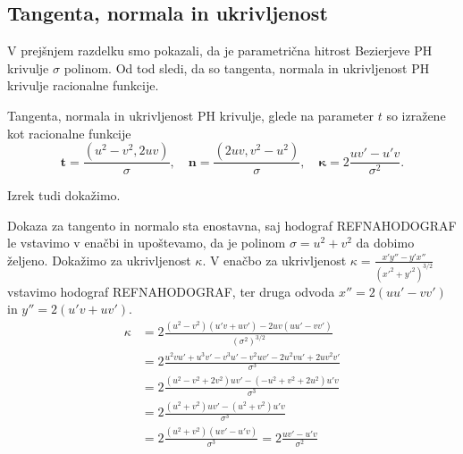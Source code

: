 \documentclass[isrm2, tisk]{fmfdelo}
\begin{document}
    \subsection{Tangenta, normala in ukrivljenost}
    V prejšnjem razdelku smo pokazali, da je parametrična hitrost Bezierjeve PH krivulje $\sigma$ polinom.
    Od tod sledi, da so tangenta, normala in ukrivljenost PH krivulje racionalne funkcije.
    \begin{izrek}
        Tangenta, normala in ukrivljenost PH krivulje, glede na parameter $t$ so izražene kot racionalne funkcije
        \[\mathbf{t}=\frac{(u^2-v^2,2uv)}{\sigma}, \quad \mathbf{n}=\frac{(2uv,v^2-u^2)}{\sigma},\quad \mathbf{\kappa}=2\frac{uv'-u'v}{\sigma^2}.\]
    \end{izrek}
    Izrek tudi dokažimo.
    \begin{dokaz}
        Dokaza za tangento in normalo sta enostavna, saj hodograf REFNAHODOGRAF le vstavimo v enačbi in upoštevamo, da je polinom $\sigma = u^2+v^2$ da dobimo željeno.
        Dokažimo za ukrivljenost $\kappa$.
        V enačbo za ukrivljenost  $\kappa = \frac{x'y''-y'x''}{(x'^2+y'^2)^{3/2}}$ vstavimo hodograf REFNAHODOGRAF, ter druga odvoda $x'' = 2(uu'-vv')$ in $y'' = 2(u'v+uv')$.
        \begin{align*}
            \kappa &= 2\frac{(u^2-v^2)(u'v+uv') - 2uv(uu'-vv')}{(\sigma^2)^{3/2}}\\
            &= 2\frac{u^2vu' + u^3v' - v^3u' - v^2uv' - 2u^2vu'+2uv^2v'}{\sigma^{3}} \\
            &= 2\frac{(u^2-v^2+2v^2)uv' - (-u^2+v^2+2u^2)u'v}{\sigma^{3}} \\
            &= 2\frac{(u^2+v^2)uv' - (u^2+v^2)u'v}{\sigma^{3}} \\
            &= 2\frac{(u^2+v^2)(uv' - u'v)}{\sigma^{3}} = 2\frac{uv' - u'v}{\sigma^{2}}
        \end{align*}
    \end{dokaz}
\end{document}
